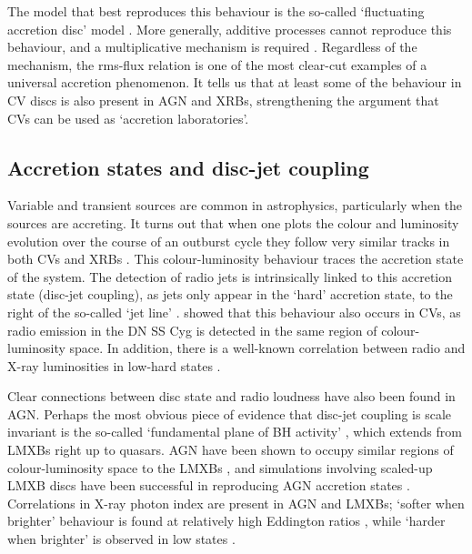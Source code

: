 The model that best reproduces this behaviour is the so-called
`fluctuating accretion disc' model \citep{lyubarskii1997,kotov2001,
arevalo2006,hogg2015}. More generally,
additive processes cannot reproduce this behaviour, and a multiplicative
mechanism is required \citep{uttley2005}. 
Regardless of the mechanism, the rms-flux relation is one of the most
clear-cut examples of a universal accretion phenomenon. 
It tells us that at least some of the behaviour in CV discs
is also present in AGN and XRBs, strengthening the argument that CVs
can be used as `accretion laboratories'. 


\subsection{Accretion states and disc-jet coupling}
\label{sec:disc-jet}

Variable and transient sources are common in astrophysics, particularly
when the sources are accreting. It turns out that when one plots
the colour and luminosity evolution over the course of an outburst cycle 
they follow very similar tracks in both CVs and XRBs
\citep[see figure~\ref{fig:kording_hid}, ][]{kordingDNjet2008}.
This colour-luminosity behaviour traces the accretion state of the system. 
The detection of radio jets is intrinsically linked to this accretion state
(disc-jet coupling), as jets only appear in the `hard' accretion 
state, to the right of the so-called `jet line' \citep{fender2001,fender2004}.
\cite{kordingDNjet2008} showed that this behaviour also occurs in CVs, 
as radio emission in the DN SS Cyg is detected in the same region 
of colour-luminosity space. In addition, there is a well-known correlation between 
radio and X-ray luminosities in low-hard states \citep{gallo2003}.

Clear connections between disc state and radio loudness have also been
found in AGN. Perhaps the most obvious piece of evidence that disc-jet coupling
is scale invariant is the so-called `fundamental plane of BH activity' 
\citep{merloni2003}, which extends from LMXBs right up to quasars. 
AGN have been shown to occupy similar regions of colour-luminosity
space to the LMXBs \citep{kording2006}, and simulations involving
scaled-up LMXB discs have been successful in reproducing AGN accretion states
\citep{sobolewska2011}. Correlations
in X-ray photon index are present in AGN and LMXBs;
`softer when brighter' behaviour is found 
at relatively high Eddington ratios \citep{mchardy1999,gu2009},
while `harder when brighter' is observed in 
low states \citep{gu2009,dimitri_llagn,connolly2016}.

